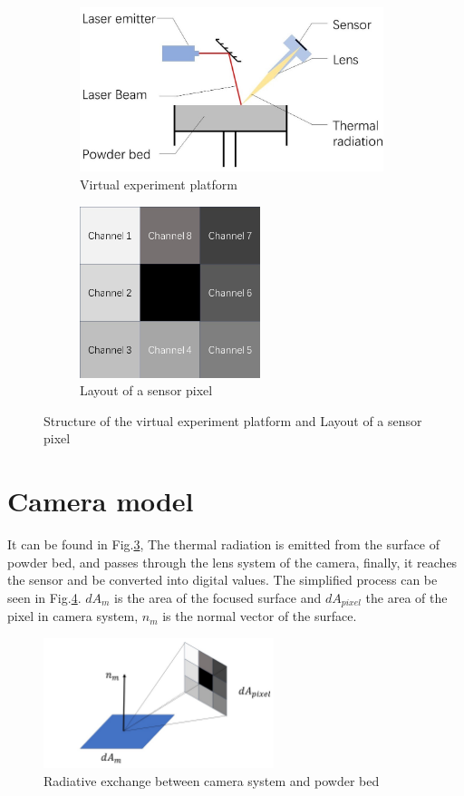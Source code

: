 \begin{figure}[htbp]
    \centering
    \begin{subfigure}{0.6\textwidth}
        \centering
        \includegraphics[height=4.8cm]{figures/virtual_platform.jpg}
        \caption{Virtual experiment platform}
        \label{fig: virtual_platform}
    \end{subfigure}
    \hfill
    \begin{subfigure}{0.37\textwidth}
        \centering
        \includegraphics[height=5cm]{figures/sensor_pixel.jpg}
        \caption{Layout of a sensor pixel}
        \label{fig: sensor_pixel}
    \end{subfigure}
    \caption{Structure of the virtual experiment platform and Layout of a sensor pixel}
    \label{fig: virtual_pixel}
\end{figure}


\section{Camera model}
It can be found in Fig.\ref{fig: virtual_pixel}, The thermal radiation is emitted from the surface of powder bed, and passes through 
the lens system of the camera, finally, it reaches the sensor and be converted into 
digital values. The simplified process can be seen in Fig.\ref{fig: view_factor}. $dA_m$ is the 
area of the focused surface and $dA_{pixel}$ the area of the pixel in camera system, $n_m$ is the 
normal vector of the surface.

\begin{figure}[htbp]
    \centering
    \includegraphics[width=0.6\textwidth]{figures/view_factor.jpg}
    \caption{Radiative exchange between camera system and powder bed}
    \label{fig: view_factor}
\end{figure}


